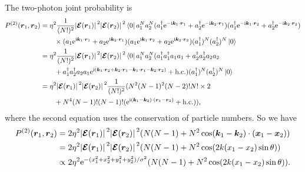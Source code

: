 \documentclass[hyperref, a4paper]{article}
\newcommand*{\ii}{\mathrm{i}}
\newcommand*{\ee}{\mathrm{e}}
\begin{document}
\begin{itemize}
The two-photon joint probability is 
\[
    \begin{aligned}
        P^{(2)}(\vb*{r}_1, \vb*{r}_2) &= \eta^2 \frac{1}{(N!)^2} \abs*{\vb*{\mathcal{E}}(\vb*{r}_1)}^2 \abs*{\vb*{\mathcal{E}}(\vb*{r}_2)}^2 \bra*{0} a_1^N a_2^N 
        (a_1^\dagger \ee^{- \ii \vb*{k}_1 \cdot \vb*{r}_1} + a_2^\dagger \ee^{- \ii \vb*{k}_2 \cdot \vb*{r}_1}) 
        (a_1^\dagger \ee^{- \ii \vb*{k}_1 \cdot \vb*{r}_2} + a_2^\dagger \ee^{- \ii \vb*{k}_2 \cdot \vb*{r}_2}) \\
        &\quad \quad \times (a_1 \ee^{\ii \vb*{k}_1 \cdot \vb*{r}_1} + a_2 \ee^{\ii \vb*{k}_2 \cdot \vb*{r}_1}) 
        (a_1 \ee^{\ii \vb*{k}_1 \cdot \vb*{r}_2} + a_2 \ee^{ \ii \vb*{k}_2 \cdot \vb*{r}_2}) (a_1^\dagger)^N  (a_2^\dagger)^N \ket*{0} \\
        &= \eta^2 \frac{1}{(N!)^2} \abs*{\vb*{\mathcal{E}}(\vb*{r}_1)}^2 \abs*{\vb*{\mathcal{E}}(\vb*{r}_2)}^2 \bra*{0} a_1^N a_2^N (a_1^\dagger a_1^\dagger a_1 a_1 + a_2^\dagger a_2^\dagger a_2 a_2 \\
        &\quad \quad + a_1^\dagger a_2^\dagger a_2 a_1 \ee^{\ii (\vb*{k}_1 \cdot \vb*{r}_2 + \vb*{k}_2 \cdot \vb*{r}_1 - \vb*{k}_1 \cdot \vb*{r}_1 - \vb*{k}_2 \cdot \vb*{r}_2)} + \text{h.c.} ) (a_1^\dagger)^N  (a_2^\dagger)^N \ket*{0} \\
        &= \eta^2 \abs*{\vb*{\mathcal{E}}(\vb*{r}_1)}^2 \abs*{\vb*{\mathcal{E}}(\vb*{r}_2)}^2 \frac{1}{(N!)^2} (N^2 (N - 1)^2 (N-2)! N! \times 2 \\
        &\quad \quad + N^4 (N-1)! (N-1)! (\ee^{\ii (\vb*{k}_1 - \vb*{k}_2) \cdot (\vb*{r}_1 - \vb*{r}_2)} + \text{h.c.})),
    \end{aligned}
\]
where the second equation uses the conservation of particle numbers.
So we have 
\begin{equation}
    \begin{aligned}
        P^{(2)}(\vb*{r}_1, \vb*{r}_2) &= 2 \eta^2 \abs*{\vb*{\mathcal{E}}(\vb*{r}_1)}^2 \abs*{\vb*{\mathcal{E}}(\vb*{r}_2)}^2 ( N (N-1) + N^2 \cos(\vb*{k}_1 - \vb*{k}_2) \cdot (\vb*{x}_1 - \vb*{x}_2) ) \\
        &= 2 \eta^2 \abs*{\vb*{\mathcal{E}}(\vb*{r}_1)}^2 \abs*{\vb*{\mathcal{E}}(\vb*{r}_2)}^2 ( N (N-1) + N^2 \cos(2 k (x_1 - x_2) \sin \theta) ) \\
        &\propto 2 \eta^2 \ee^{- (x_1^2 + x_2^2 + y_1^2 + y_2^2) / \sigma^2} ( N (N-1) + N^2 \cos(2 k (x_1 - x_2) \sin \theta) ) .
    \end{aligned}
    \label{eq:prob-1-b-2}
\end{equation}


\end{itemize}
\end{document}
